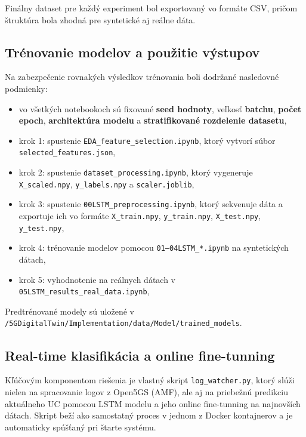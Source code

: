 Finálny dataset pre každý experiment bol exportovaný vo formáte CSV, pričom štruktúra bola zhodná pre syntetické aj reálne dáta.

\subsection*{Trénovanie modelov a použitie výstupov}

Na zabezpečenie rovnakých výsledkov trénovania boli dodržané nasledovné podmienky:

\begin{itemize}
  \item vo všetkých notebookoch sú fixované \textbf{seed hodnoty}, veľkosť \textbf{batchu}, \textbf{počet epoch}, \textbf{architektúra modelu} a \textbf{stratifikované rozdelenie datasetu},
  \item krok 1: spustenie \texttt{EDA\_feature\_selection.ipynb}, ktorý vytvorí súbor \\ \texttt{selected\_features.json},
  \item krok 2: spustenie \texttt{dataset\_processing.ipynb}, ktorý vygeneruje \texttt{X\_scaled.npy}, \texttt{y\_labels.npy} a \texttt{scaler.joblib},
  \item krok 3: spustenie \texttt{00LSTM\_preprocessing.ipynb}, ktorý sekvenuje dáta a exportuje ich vo formáte \texttt{X\_train.npy}, \texttt{y\_train.npy}, \texttt{X\_test.npy}, \texttt{y\_test.npy},
  \item krok 4: trénovanie modelov pomocou \texttt{01–04LSTM\_*.ipynb} na syntetických dátach,
  \item krok 5: vyhodnotenie na reálnych dátach v \texttt{05LSTM\_results\_real\_data.ipynb},
\end{itemize}

Predtrénované modely sú uložené v \\ \texttt{/5GDigitalTwin/Implementation/data/Model/trained\_models}.

\subsection*{Real-time klasifikácia a online fine-tunning}

Kľúčovým komponentom riešenia je vlastný skript \texttt{log\_watcher.py}, ktorý slúži nielen na spracovanie logov z Open5GS (AMF), ale aj na priebežnú predikciu aktuálneho UC pomocou LSTM modelu a jeho online fine-tunning na najnovších dátach. Skript beží ako samostatný proces v jednom z Docker kontajnerov a je automaticky spúšťaný pri štarte systému.

